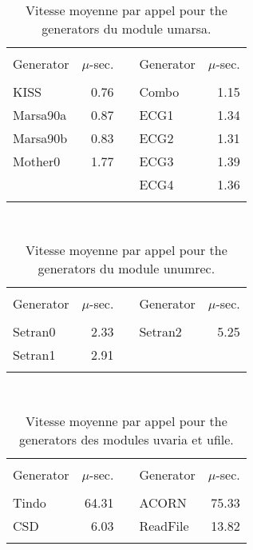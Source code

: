\begin{table}[htb] \centering \tt
\caption {\rm Vitesse moyenne par appel pour the generators 
              du module umarsa.}
\label {vitesse8}
\begin{tabular}{|l|r|c|l|r|}
\hline
&&&&\\
\multicolumn{1}{|c|}{\rm Generator} & $\mu$-sec. && {\rm Generator}
   & $\mu$-sec.\\
\hline \hline
&&&&\\
 KISS                 &   0.76 && Combo        &   1.15\\
 Marsa90a             &   0.87 && ECG1         &   1.34\\
 Marsa90b             &   0.83 && ECG2         &   1.31\\
 Mother0              &   1.77 && ECG3         &   1.39\\
                       &&& ECG4                &   1.36 \\
&&&&\\
\hline
\end{tabular}
\end {table}

\begin{table}[htb] \centering \tt
\caption {\rm Vitesse moyenne par appel pour the generators 
              du module unumrec.}
\label {vitesse9}
\begin{tabular}{|l|r|c|l|r|}
\hline
&&&&\\
\multicolumn{1}{|c|}{\rm Generator} & $\mu$-sec. && {\rm Generator}
   & $\mu$-sec.\\
\hline \hline
&&&&\\
 Setran0              &   2.33 &&  Setran2      &   5.25\\
 Setran1              &   2.91 &&               &       \\
&&&&\\
\hline
\end{tabular}

\end {table}

\begin{table}[htb] \centering \tt
\caption {\rm Vitesse moyenne par appel pour the generators 
              des modules uvaria et ufile.}
\label {vitesse10}
\begin{tabular}{|l|r|c|l|r|}
\hline
&&&&\\
\multicolumn{1}{|c|}{\rm Generator} & $\mu$-sec. && {\rm Generator}
   & $\mu$-sec.\\
\hline \hline
&&&&\\
 Tindo                &  64.31 && ACORN        &  75.33\\
 CSD                  &   6.03 && ReadFile     &  13.82\\
&&&&\\
\hline
\end{tabular}

\end {table}

\fi   %
